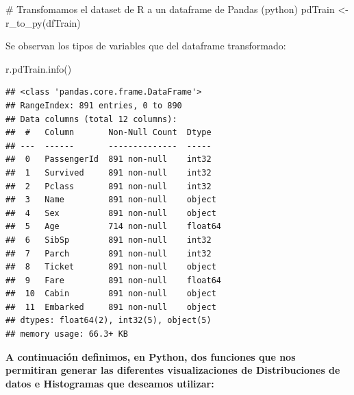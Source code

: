 \documentclass[
]{article}
\newenvironment{Shaded}{\begin{snugshade}}{\end{snugshade}}
\newcommand{\CommentTok}[1]{\textcolor[rgb]{0.50,0.62,0.50}{#1}}
\newcommand{\KeywordTok}[1]{\textcolor[rgb]{0.94,0.87,0.69}{#1}}
\newcommand{\NormalTok}[1]{\textcolor[rgb]{0.80,0.80,0.80}{#1}}
\newcommand{\StringTok}[1]{\textcolor[rgb]{0.80,0.58,0.58}{#1}}
\begin{document}
\begin{Shaded}
\begin{Highlighting}[]
\CommentTok{# Transfomamos el dataset de R a un dataframe de Pandas (python) }
\NormalTok{pdTrain <-}\StringTok{ }\KeywordTok{r_to_py}\NormalTok{(dfTrain)}
\end{Highlighting}
\end{Shaded}

Se observan los tipos de variables que del dataframe transformado:

\begin{Shaded}
\begin{Highlighting}[]
\NormalTok{r.pdTrain.info()}
\end{Highlighting}
\end{Shaded}

\begin{verbatim}
## <class 'pandas.core.frame.DataFrame'>
## RangeIndex: 891 entries, 0 to 890
## Data columns (total 12 columns):
##  #   Column       Non-Null Count  Dtype  
## ---  ------       --------------  -----  
##  0   PassengerId  891 non-null    int32  
##  1   Survived     891 non-null    int32  
##  2   Pclass       891 non-null    int32  
##  3   Name         891 non-null    object 
##  4   Sex          891 non-null    object 
##  5   Age          714 non-null    float64
##  6   SibSp        891 non-null    int32  
##  7   Parch        891 non-null    int32  
##  8   Ticket       891 non-null    object 
##  9   Fare         891 non-null    float64
##  10  Cabin        891 non-null    object 
##  11  Embarked     891 non-null    object 
## dtypes: float64(2), int32(5), object(5)
## memory usage: 66.3+ KB
\end{verbatim}

\textbf{A continuación definimos, en Python, dos funciones que nos
permitiran generar las diferentes visualizaciones de Distribuciones de
datos e Histogramas que deseamos utilizar:}
\end{document}
